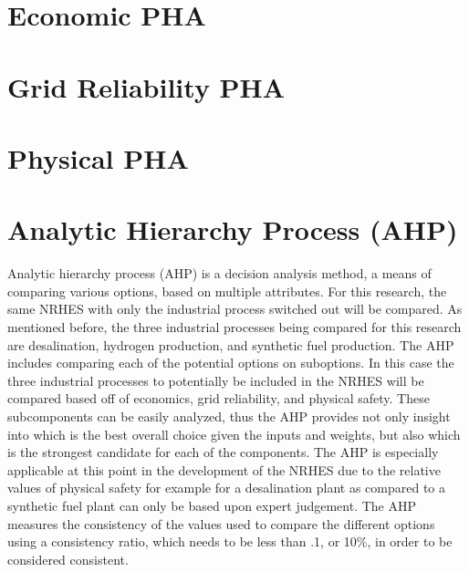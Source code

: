 \documentclass[12pt]{UIdahoMastersThesis}
\begin{document}
\section{Economic PHA}

\section{Grid Reliability PHA}

\section{Physical PHA}

\section{Analytic Hierarchy Process (AHP)}
Analytic hierarchy process (AHP) is a decision analysis method, a means of comparing various options, based on multiple attributes. For this research, the same NRHES with only the industrial process switched out will be compared. As mentioned before, the three industrial processes being compared for this research are desalination, hydrogen production, and synthetic fuel production. The AHP includes comparing each of the potential options on suboptions. In this case the three industrial processes to potentially be included in the NRHES will be compared based off of economics, grid reliability, and physical safety. These subcomponents can be easily analyzed, thus the AHP provides not only insight into which is the best overall choice given the inputs and weights, but also which is the strongest candidate for each of the components. The AHP is especially applicable at this point in the development of the NRHES due to the relative values of physical safety for example for a desalination plant as compared to a synthetic fuel plant can only be based upon expert judgement. The AHP measures the consistency of the values used to compare the different options using a consistency ratio, which needs to be less than .1, or 10\%, in order to be considered consistent.
\end{document}
